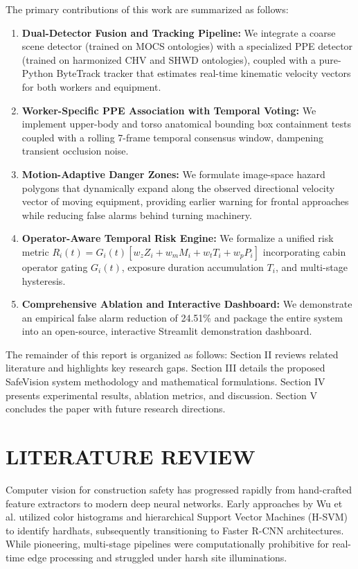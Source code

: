 \documentclass[letterpaper, 10 pt, conference]{ieeeconf}
\begin{document}
The primary contributions of this work are summarized as follows:
\begin{enumerate}
    \item \textbf{Dual-Detector Fusion and Tracking Pipeline:} We integrate a coarse scene detector (trained on MOCS ontologies) with a specialized PPE detector (trained on harmonized CHV and SHWD ontologies), coupled with a pure-Python ByteTrack tracker that estimates real-time kinematic velocity vectors for both workers and equipment.
    \item \textbf{Worker-Specific PPE Association with Temporal Voting:} We implement upper-body and torso anatomical bounding box containment tests coupled with a rolling 7-frame temporal consensus window, dampening transient occlusion noise.
    \item \textbf{Motion-Adaptive Danger Zones:} We formulate image-space hazard polygons that dynamically expand along the observed directional velocity vector of moving equipment, providing earlier warning for frontal approaches while reducing false alarms behind turning machinery.
    \item \textbf{Operator-Aware Temporal Risk Engine:} We formalize a unified risk metric $R_i(t) = G_i(t) [w_z Z_i + w_m M_i + w_t T_i + w_p P_i]$ incorporating cabin operator gating $G_i(t)$, exposure duration accumulation $T_i$, and multi-stage hysteresis.
    \item \textbf{Comprehensive Ablation and Interactive Dashboard:} We demonstrate an empirical false alarm reduction of 24.51\% and package the entire system into an open-source, interactive Streamlit demonstration dashboard.
\end{enumerate}

The remainder of this report is organized as follows: Section II reviews related literature and highlights key research gaps. Section III details the proposed SafeVision system methodology and mathematical formulations. Section IV presents experimental results, ablation metrics, and discussion. Section V concludes the paper with future research directions.

\section{LITERATURE REVIEW}

Computer vision for construction safety has progressed rapidly from hand-crafted feature extractors to modern deep neural networks. Early approaches by Wu et al. \cite{wu2019automatic} utilized color histograms and hierarchical Support Vector Machines (H-SVM) to identify hardhats, subsequently transitioning to Faster R-CNN architectures. While pioneering, multi-stage pipelines were computationally prohibitive for real-time edge processing and struggled under harsh site illuminations.
\end{document}
